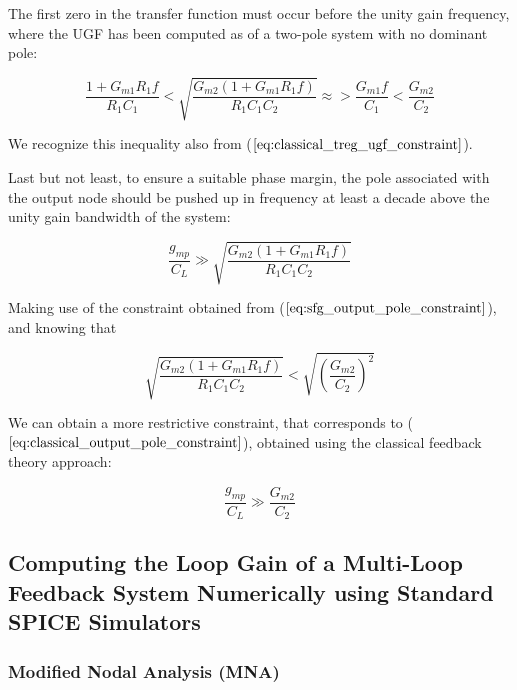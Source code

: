 \documentclass[
]{article}
\begin{document}
The first zero in the transfer function must occur before the unity gain
frequency, where the UGF has been computed as of a two-pole system with
no dominant pole:

\begin{equation}
    \frac{1+G_{m1}R_1f}{R_1C_1} < \sqrt{\frac{G_{m2}(1+G_{m1}R_1f)}{R_1C_1C_2}} \approx> \frac{G_{m1}f}{C_1} < \frac{G_{m2}}{C_2}
    \label{eq:zero_frequency_condition}
\end{equation}

We recognize this inequality also from
(\(\ref{eq:classical_treg_ugf_constraint}\)).

Last but not least, to ensure a suitable phase margin, the pole
associated with the output node should be pushed up in frequency at
least a decade above the unity gain bandwidth of the system:

\begin{equation}
    \frac{g_{mp}}{C_L} \gg \sqrt{\frac{G_{m2}(1+G_{m1}R_1f)}{R_1C_1C_2}}
    \label{eq:sfg_output_pole_constraint}
\end{equation}

Making use of the constraint obtained from
(\(\ref{eq:sfg_output_pole_constraint}\)), and knowing that

\begin{equation}
    \sqrt{\frac{G_{m2}(1+G_{m1}R_1f)}{R_1C_1C_2}} < \sqrt{(\frac{G_{m2}}{C_2})^2}
\end{equation}

We can obtain a more restrictive constraint, that corresponds to
(\(\ref{eq:classical_output_pole_constraint}\)), obtained using the
classical feedback theory approach:

\begin{equation}
    \frac{g_{mp}}{C_L} \gg \frac{G_{m2}}{C_2}
    \label{eq:output_pole_constraint}
\end{equation}

\subsection{Computing the Loop Gain of a Multi-Loop Feedback System
Numerically using Standard SPICE
Simulators}\label{sec:loop_gain_from_mna_matrices}

\subsubsection{Modified Nodal Analysis
(MNA)}\label{_modified_nodal_analysis_mna}
\end{document}
